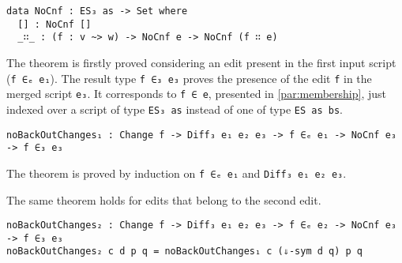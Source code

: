 \documentclass[../Thesis.tex]{subfiles}
\begin{document}
\begin{verbatim}	
data NoCnf : ES₃ as -> Set where
  [] : NoCnf []
  _∷_ : (f : v ~> w) -> NoCnf e -> NoCnf (f ∷ e)
\end{verbatim}
			
	The theorem is firstly proved considering an edit present in
	the first input script (\texttt{f ∈ₑ e₁}).
	The result type \texttt{f ∈₃ e₃} proves the presence of the edit \texttt{f}
	in the merged script \texttt{e₃}. 
	It corresponds to \texttt{f ∈ e}, presented in 
	\ref{par:membership}, just indexed over a script of type \texttt{ES₃ as}
	instead of one of 	type \texttt{ES as bs}.
	
\begin{verbatim}
noBackOutChanges₁ : Change f -> Diff₃ e₁ e₂ e₃ -> f ∈ₑ e₁ -> NoCnf e₃ -> f ∈₃ e₃
\end{verbatim}

	The theorem is proved by induction on \texttt{f ∈ₑ e₁} and 
	\texttt{Diff₃ e₁ e₂ e₃}.

	The same theorem holds for edits that belong to the second edit.
	
\begin{verbatim}
noBackOutChanges₂ : Change f -> Diff₃ e₁ e₂ e₃ -> f ∈ₑ e₂ -> NoCnf e₃ -> f ∈₃ e₃
noBackOutChanges₂ c d p q = noBackOutChanges₁ c (⇓-sym d q) p q
\end{verbatim}
	
\end{document}
